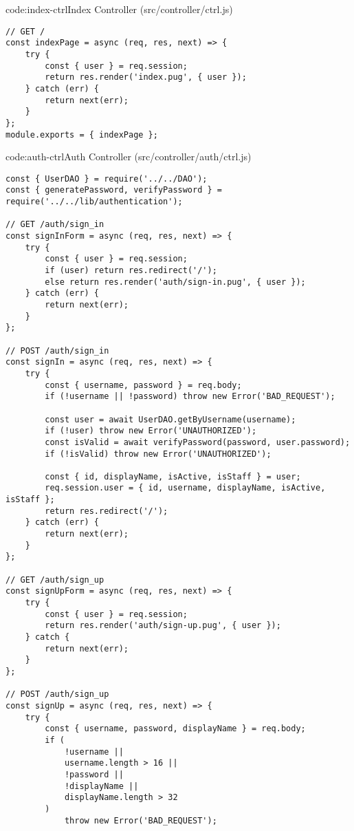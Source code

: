 \begin{codeenv}{code:index-ctrl}{Index Controller (src/controller/ctrl.js)}\begin{verbatim}
// GET /
const indexPage = async (req, res, next) => {
    try {
        const { user } = req.session;
        return res.render('index.pug', { user });
    } catch (err) {
        return next(err);
    }
};
module.exports = { indexPage };
\end{verbatim}
\end{codeenv}

\begin{codeenv}{code:auth-ctrl}{Auth Controller (src/controller/auth/ctrl.js)}\begin{verbatim}
const { UserDAO } = require('../../DAO');
const { generatePassword, verifyPassword } = require('../../lib/authentication');

// GET /auth/sign_in
const signInForm = async (req, res, next) => {
    try {
        const { user } = req.session;
        if (user) return res.redirect('/');
        else return res.render('auth/sign-in.pug', { user });
    } catch (err) {
        return next(err);
    }
};

// POST /auth/sign_in
const signIn = async (req, res, next) => {
    try {
        const { username, password } = req.body;
        if (!username || !password) throw new Error('BAD_REQUEST');

        const user = await UserDAO.getByUsername(username);
        if (!user) throw new Error('UNAUTHORIZED');
        const isValid = await verifyPassword(password, user.password);
        if (!isValid) throw new Error('UNAUTHORIZED');

        const { id, displayName, isActive, isStaff } = user;
        req.session.user = { id, username, displayName, isActive, isStaff };
        return res.redirect('/');
    } catch (err) {
        return next(err);
    }
};

// GET /auth/sign_up
const signUpForm = async (req, res, next) => {
    try {
        const { user } = req.session;
        return res.render('auth/sign-up.pug', { user });
    } catch {
        return next(err);
    }
};

// POST /auth/sign_up
const signUp = async (req, res, next) => {
    try {
        const { username, password, displayName } = req.body;
        if (
            !username ||
            username.length > 16 ||
            !password ||
            !displayName ||
            displayName.length > 32
        )
            throw new Error('BAD_REQUEST');


\end{verbatim}
\end{codeenv}
